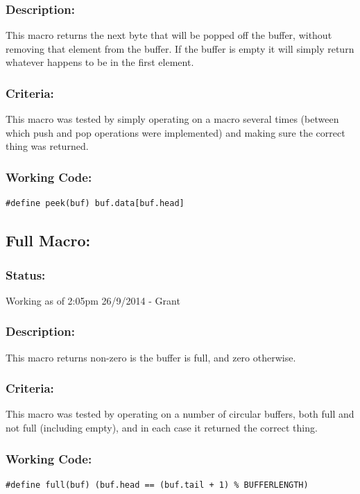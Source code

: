 \documentclass[]{report}
\begin{document}
\subsubsection{Description:}
This macro returns the next byte that will be popped off the buffer, without removing that element from the buffer. If the buffer is empty it will simply return whatever happens to be in the first element.

\subsubsection{Criteria:}
This macro was tested by simply operating on a macro several times (between which push and pop operations were implemented) and making sure the correct thing was returned.

\subsubsection{Working Code:}
\begin{lstlisting}
#define peek(buf) buf.data[buf.head]
\end{lstlisting}

\subsection{Full Macro:}
\subsubsection{Status:}
Working as of 2:05pm 26/9/2014 - Grant

\subsubsection{Description:}
This macro returns non-zero is the buffer is full, and zero otherwise. 

\subsubsection{Criteria:}
This macro was tested by operating on a number of circular buffers, both full and not full (including empty), and in each case it returned the correct thing.

\subsubsection{Working Code:}
\begin{lstlisting}
#define full(buf) (buf.head == (buf.tail + 1) % BUFFERLENGTH)
\end{lstlisting}
\end{document}
